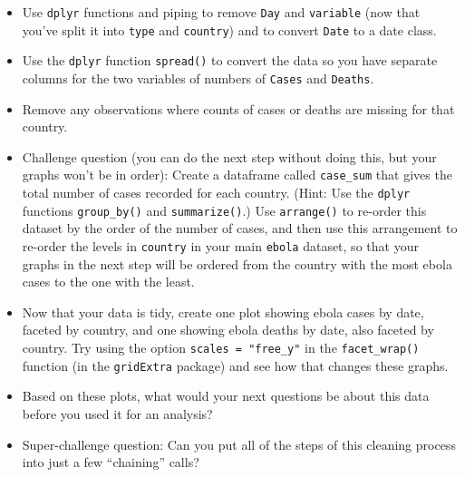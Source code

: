 \documentclass[]{book}
\makeatletter
\newenvironment{Shaded}{\begin{snugshade}}{\end{snugshade}}
\newcommand{\KeywordTok}[1]{\textcolor[rgb]{0.13,0.29,0.53}{\textbf{{#1}}}}
\newcommand{\DataTypeTok}[1]{\textcolor[rgb]{0.13,0.29,0.53}{{#1}}}
\newcommand{\DecValTok}[1]{\textcolor[rgb]{0.00,0.00,0.81}{{#1}}}
\newcommand{\StringTok}[1]{\textcolor[rgb]{0.31,0.60,0.02}{{#1}}}
\newcommand{\OtherTok}[1]{\textcolor[rgb]{0.56,0.35,0.01}{{#1}}}
\newcommand{\NormalTok}[1]{{#1}}
\providecommand{\tightlist}{%
  \setlength{\itemsep}{0pt}\setlength{\parskip}{0pt}}
\newenvironment{kframe}{%
\medskip{}
\setlength{\fboxsep}{.8em}
 \def\at@end@of@kframe{}%
 \ifinner\ifhmode%
  \def\at@end@of@kframe{\end{minipage}}%
  \begin{minipage}{\columnwidth}%
 \fi\fi%
 \def\FrameCommand##1{\hskip\@totalleftmargin \hskip-\fboxsep
 \colorbox{shadecolor}{##1}\hskip-\fboxsep
     \hskip-\linewidth \hskip-\@totalleftmargin \hskip\columnwidth}%
 \MakeFramed {\advance\hsize-\width
   \@totalleftmargin\z@ \linewidth\hsize
   \@setminipage}}%
 {\par\unskip\endMakeFramed%
 \at@end@of@kframe}
\renewenvironment{Shaded}{\begin{kframe}}{\end{kframe}}
\makeatother
\begin{document}
\begin{Shaded}
\end{Shaded}

\begin{itemize}
\tightlist
\item
  Use \texttt{dplyr} functions and piping to remove \texttt{Day} and
  \texttt{variable} (now that you've split it into \texttt{type} and
  \texttt{country}) and to convert \texttt{Date} to a date class.
\item
  Use the \texttt{dplyr} function \texttt{spread()} to convert the data
  so you have separate columns for the two variables of numbers of
  \texttt{Cases} and \texttt{Deaths}.
\item
  Remove any observations where counts of cases or deaths are missing
  for that country.
\item
  Challenge question (you can do the next step without doing this, but
  your graphs won't be in order): Create a dataframe called
  \texttt{case\_sum} that gives the total number of cases recorded for
  each country. (Hint: Use the \texttt{dplyr} functions
  \texttt{group\_by()} and \texttt{summarize()}.) Use \texttt{arrange()}
  to re-order this dataset by the order of the number of cases, and then
  use this arrangement to re-order the levels in \texttt{country} in
  your main \texttt{ebola} dataset, so that your graphs in the next step
  will be ordered from the country with the most ebola cases to the one
  with the least.
\item
  Now that your data is tidy, create one plot showing ebola cases by
  date, faceted by country, and one showing ebola deaths by date, also
  faceted by country. Try using the option \texttt{scales\ =\ "free\_y"}
  in the \texttt{facet\_wrap()} function (in the \texttt{gridExtra}
  package) and see how that changes these graphs.
\item
  Based on these plots, what would your next questions be about this
  data before you used it for an analysis?
\item
  Super-challenge question: Can you put all of the steps of this
  cleaning process into just a few ``chaining'' calls?
\end{itemize}
\end{document}
